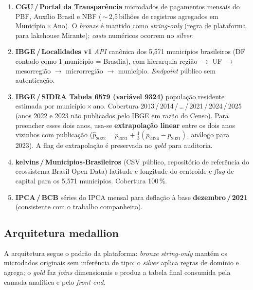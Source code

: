 \documentclass[12pt,a4paper,oneside]{article}
\begin{document}
\begin{enumerate}
    \item \textbf{CGU\,/\,Portal da Transparência} \textemdash{}
    microdados de pagamentos mensais do PBF, Auxílio Brasil e NBF
    (\,$\sim$\,2{,}5\,bilhões de registros agregados em
    Município\,$\times$\,Ano). O \textit{bronze} é mantido como
    \textit{string-only} (regra de plataforma para lakehouse Mirante);
    \textit{casts} numéricos ocorrem no \textit{silver}.

    \item \textbf{IBGE\,/\,Localidades v1} \textemdash{}
    \textit{API} canônica dos 5{,}571 municípios brasileiros (DF
    contado como 1 município = Brasília), com hierarquia região $\to$
    UF $\to$ mesorregião $\to$ microrregião $\to$ município.
    \textit{Endpoint} público sem autenticação.

    \item \textbf{IBGE\,/\,SIDRA Tabela 6579 (variável 9324)}
    \textemdash{} população residente estimada por município\,$\times$\,ano.
    Cobertura 2013\,/\,2014\,/\,\ldots\,/\,2021\,/\,2024\,/\,2025
    (anos 2022 e 2023 não publicados pelo IBGE em razão do Censo).
    Para preencher esses dois anos, usa-se \textbf{extrapolação
    linear} entre os dois anos vizinhos com publicação
    ($\hat{p}_{2022} = p_{2021} + \tfrac{1}{3}(p_{2024} - p_{2021})$,
    análogo para 2023). A flag de extrapolação é preservada no
    \textit{gold} para auditoria.

    \item \textbf{kelvins\,/\,Municipios-Brasileiros} (CSV público,
    repositório de referência do ecossistema Brasil-Open-Data)
    \textemdash{} latitude e longitude do centroide e \textit{flag} de
    capital para os 5{,}571 municípios. Cobertura 100\,\%.

    \item \textbf{IPCA\,/\,BCB} \textemdash{} séries do IPCA mensal
    para deflação à base \textbf{dezembro\,/\,2021} (consistente com
    o trabalho companheiro).
\end{enumerate}

\subsection{Arquitetura medallion}

A arquitetura segue o padrão da plataforma:
\textit{bronze} \textit{string-only} mantém os microdados originais
sem inferência de tipo; o \textit{silver} aplica regras de domínio e
agrega; o \textit{gold} faz \textit{joins} dimensionais e produz a
tabela final consumida pela camada analítica e pelo \textit{front-end}.
\end{document}
